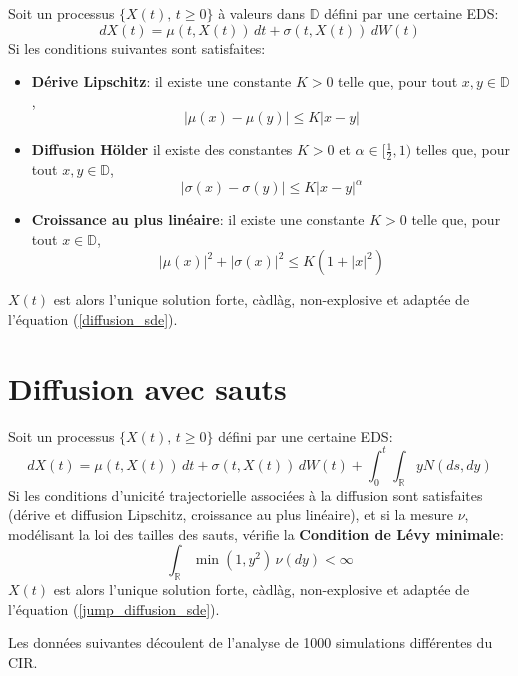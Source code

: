 Soit un processus \( \{X(t),\, t \geq 0\} \) à valeurs dans \(\mathds{D}\) défini par une certaine \ac{EDS}:
\begin{equation}\label{diffusion_sde}
    dX(t) = \mu(t,X(t))\,dt + \sigma(t,X(t))\,dW(t)
\end{equation}
Si les conditions suivantes sont satisfaites:
\begin{itemize}
    \item \textbf{Dérive Lipschitz}: il existe une constante \( K > 0 \) telle que, pour tout \( x,y \in \mathds{D} \),
    \[
    |\mu(x)-\mu(y)|\leq K|x-y|
    \]
    \item \textbf{Diffusion Hölder} il existe des constantes \( K > 0 \) et \(\alpha\in[\frac{1}{2},1)\) telles que, pour tout \( x,y \in \mathds{D} \),
    \[
    |\sigma(x)-\sigma(y)|\leq K{|x-y|}^\alpha
    \]
    \item \textbf{Croissance au plus linéaire}: il existe une constante \( K > 0 \) telle que, pour tout \( x \in \mathds{D} \),
    \[
    |\mu(x)|^2 + |\sigma(x)|^2 \leq K(1 + |x|^2)
    \]
\end{itemize}
$X(t)$ est alors l'unique solution forte, càdlàg, non-explosive  et adaptée de l'équation (\ref{diffusion_sde}).

\section*{Diffusion avec sauts}
Soit un processus \( \{X(t),\, t \geq 0\} \) défini par une certaine \ac{EDS}:
\begin{equation}\label{jump_diffusion_sde}
    dX(t) = \mu(t, X(t))\,dt + \sigma(t, X(t))\,dW(t) + \int_0^t\int_{\mathds{R}} yN(ds,dy)
\end{equation}
Si les conditions d'unicité trajectorielle associées à la diffusion sont satisfaites (dérive et diffusion Lipschitz, croissance au plus linéaire), et si la mesure \( \nu \), modélisant la loi des tailles des sauts, vérifie la \textbf{Condition de Lévy minimale}:
\[
\int_{\mathds{R}}\min(1, y^2)\, \nu(dy) < \infty
\]
$X(t)$ est alors l'unique solution forte, càdlàg, non-explosive et adaptée de l'équation (\ref{jump_diffusion_sde}).

\label{control_simulations}

Les données suivantes découlent de l'analyse de 1000 simulations différentes du \acs{CIR}. 

